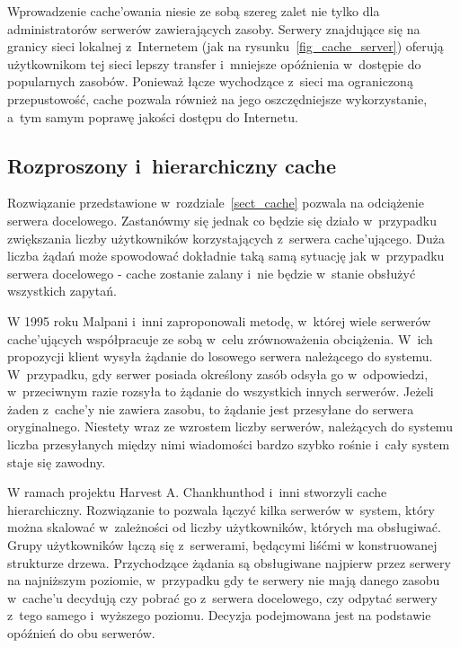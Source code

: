 \documentclass[a4paper,11pt]{scrartcl}
\newcommand{\s}{ }
\newcommand{\kesz}{cache}
\newcommand{\keszy}{cache'y}
\newcommand{\keszu}{cache'u}
\newcommand{\keszujacego}{cache'ującego}
\newcommand{\keszujacych}{cache'ujących}
\newcommand{\keszowania}{cache'owania}
\begin{document}
Wprowadzenie \keszowania\s niesie ze sobą szereg zalet nie tylko dla administratorów serwerów zawierających zasoby. Serwery znajdujące się na granicy sieci lokalnej z~Internetem (jak na rysunku~\ref{fig_cache_server}) oferują użytkownikom tej sieci lepszy transfer i~mniejsze opóźnienia w~dostępie do popularnych zasobów.
Ponieważ łącze wychodzące z~sieci ma ograniczoną przepustowość, \kesz\s pozwala również na jego oszczędniejsze wykorzystanie, a~tym samym poprawę jakości dostępu do Internetu.

\subsection{Rozproszony i~hierarchiczny \kesz}\label{sect_dist_cache}
Rozwiązanie przedstawione w~rozdziale~\ref{sect_cache} pozwala na odciążenie serwera docelowego. Zastanówmy się jednak co będzie się działo w~przypadku zwiększania liczby użytkowników korzystających z~serwera \keszujacego. Duża liczba żądań może spowodować dokładnie taką samą sytuację jak w~przypadku serwera docelowego - \kesz\s zostanie zalany i~nie będzie w~stanie obsłużyć wszystkich zapytań.

W 1995 roku Malpani i~inni \cite{malpani1995making} zaproponowali metodę, w~której wiele serwerów \keszujacych\s współpracuje ze sobą w~celu zrównoważenia obciążenia. W~ich propozycji klient wysyła żądanie do losowego serwera należącego do systemu. W~przypadku, gdy serwer posiada określony zasób odsyła go w~odpowiedzi, w~przeciwnym razie rozsyła to żądanie do wszystkich innych serwerów. Jeżeli żaden z~\keszy\s nie zawiera zasobu, to żądanie jest przesyłane do serwera oryginalnego. Niestety wraz ze wzrostem liczby serwerów, należących do systemu liczba przesyłanych między nimi wiadomości bardzo szybko rośnie i~cały system staje się zawodny.

W ramach projektu Harvest \cite{bowman1994harvest} A. Chankhunthod i~inni \cite{chankhunthod1995hierarchical} stworzyli \kesz\s hierarchiczny. Rozwiązanie to pozwala łączyć kilka serwerów w~system, który można skalować w~zależności od liczby użytkowników, których ma obsługiwać. Grupy użytkowników łączą się z~serwerami, będącymi liśćmi w konstruowanej strukturze drzewa. Przychodzące żądania są obsługiwane najpierw przez serwery na najniższym poziomie, w~przypadku gdy te serwery nie mają danego zasobu w~\keszu\s decydują czy pobrać go z~serwera docelowego, czy odpytać serwery z~tego samego i~wyższego poziomu. Decyzja podejmowana jest na podstawie opóźnień do obu serwerów.
\end{document}
